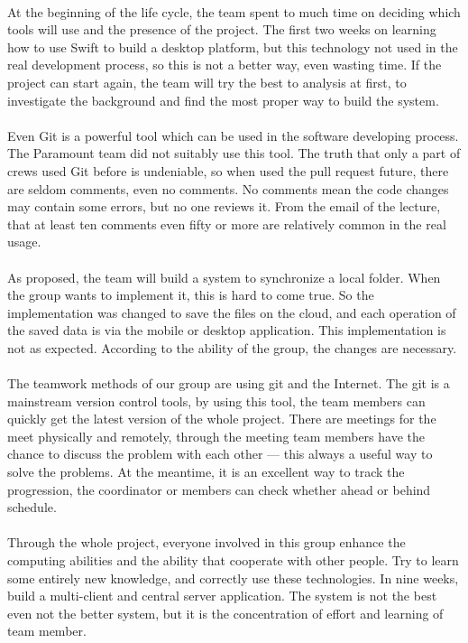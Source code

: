 \documentclass[11pt]{article}
\begin{document}
\\
At the beginning of the life cycle, the team spent to much time on deciding which tools will use and the presence of the project. The first two weeks on learning how to use Swift to build a desktop platform, but this technology not used in the real development process, so this is not a better way, even wasting time. If the project can start again, the team will try the best to analysis at first, to investigate the background and find the most proper way to build the system. 
\\
\\
Even Git is a powerful tool which can be used in the software developing process. The Paramount team did not suitably use this tool. The truth that only a part of crews used Git before is undeniable, so when used the pull request future, there are seldom comments, even no comments. No comments mean the code changes may contain some errors, but no one reviews it. From the email of the lecture, that at least ten comments even fifty or more are relatively common in the real usage.
\\
\\
As proposed, the team will build a system to synchronize a local folder. When the group wants to implement it, this is hard to come true. So the implementation was changed to save the files on the cloud, and each operation of the saved data is via the mobile or desktop application. This implementation is not as expected. According to the ability of the group, the changes are necessary.
\\
\\
The teamwork methods of our group are using git and the Internet.  The git is a mainstream version control tools,  by using this tool, the team members can quickly get the latest version of the whole project. There are meetings for the meet physically and remotely, through the meeting team members have the chance to discuss the problem with each other — this always a useful way to solve the problems. At the meantime,  it is an excellent way to track the progression, the coordinator or members can check whether ahead or behind schedule.
\\
\\
Through the whole project, everyone involved in this group enhance the computing abilities and the ability that cooperate with other people. Try to learn some entirely new knowledge, and correctly use these technologies. In nine weeks, build a multi-client and central server application. The system is not the best even not the better system, but it is the concentration of effort and learning of team member.  
\end{document}
